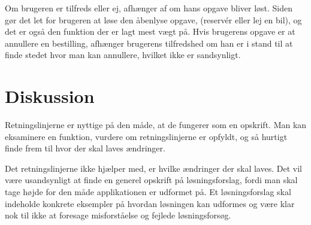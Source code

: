 \documentclass[a4paper]{article}
\begin{document}
Om brugeren er tilfreds eller ej, afhænger af om hans opgave bliver løst. Siden
gør det let for brugeren at løse den åbenlyse opgave, (reservér eller lej en
bil), og det er også den funktion der er lagt mest vægt på. Hvis brugerens
opgave er at annullere en bestilling, afhænger brugerens tilfredshed om han er i
stand til at finde stedet hvor man kan annullere, hvilket ikke er sandsynligt.

\section{Diskussion}

Retningslinjerne er nyttige på den måde, at de fungerer som en opskrift. Man kan
eksaminere en funktion, vurdere om retningslinjerne er opfyldt, og så hurtigt 
finde frem til hvor der skal laves ændringer. 

Det retningslinjerne ikke hjælper med, er hvilke ændringer der skal laves. 
Det vil være usandsynligt at finde en generel opskrift på løsningsforslag, 
fordi man skal tage højde for den måde applikationen er udformet på. Et 
løsningsforslag skal indeholde konkrete eksempler på hvordan løsningen
kan udformes og være klar nok til ikke at foresage misforståelse og 
fejlede løsningsforsøg.
\end{document}
